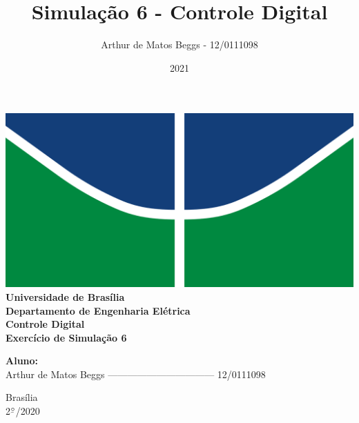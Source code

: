 \documentclass{article}
\title{Simulação 6 - Controle Digital}
\author{Arthur de Matos Beggs - 12/0111098}
\date{2021}
\newcommand{\ubar}[1]{\underaccent{\bar}{#1}}
\begin{document}
\begin{titlepage}
    \begin{center}
        \centering
        \includegraphics[width=.7\linewidth]{images/logo_unb.png}\\[0.5cm]
        {\large \textbf{Universidade de Brasília}}\\[0.2cm]
        {\large \textbf{Departamento de Engenharia Elétrica}}\\[0.2cm]
        {\large \textbf{Controle Digital}}\\[4.8cm]
        {\bf \huge {Exercício de Simulação 6}}\\[0.2cm]
        {\bf \large {}}
    \end{center}

    \vspace{5cm}
    \hspace{2cm} {\noindent \bf \large {Aluno:}}\\
    \vspace{0.8cm}
    \hspace{2.35cm} {\large Arthur de Matos Beggs --------------------------------- 12/0111098}\\[1cm]

    \begin{center}
        {\large Brasília}\\
        {\large 2$^{\ubar{\circ}}$/2020}
    \end{center}

\end{titlepage}

\clearpage %

\setcounter{page}{2}
\end{document}
